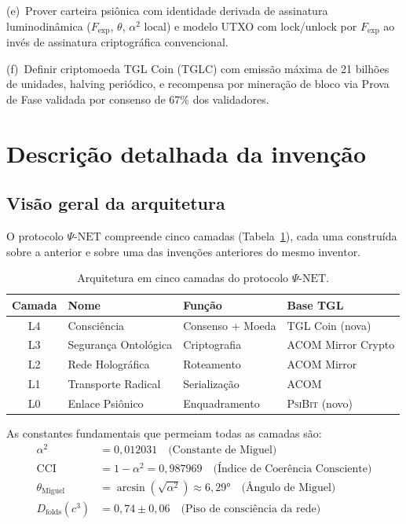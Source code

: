 \documentclass[12pt,a4paper]{article}
\newcommand{\alphaii}{\alpha^2}
\newcommand{\Dfolds}{D_{\text{folds}}}
\newcommand{\Fexp}{F_{\text{exp}}}
\newcommand{\thetaM}{\theta_{\text{Miguel}}}
\newcommand{\PsiBit}{\textsc{PsiBit}}
\newcommand{\PsiNet}{\Psi\text{-NET}}
\begin{document}
(e)~Prover carteira psiônica com identidade derivada de
assinatura luminodinâmica ($\Fexp$, $\theta$, $\alphaii$ local)
e modelo UTXO com lock/unlock por $\Fexp$ ao invés de
assinatura criptográfica convencional.

(f)~Definir criptomoeda TGL Coin (TGLC) com emissão máxima de
21 bilhões de unidades, halving periódico, e recompensa por
mineração de bloco via Prova de Fase validada por consenso de
67\% dos validadores.

\newpage
\section{Descrição detalhada da invenção}

\subsection{Visão geral da arquitetura}

O protocolo $\PsiNet$ compreende cinco camadas (Tabela~\ref{tab:camadas}),
cada uma construída sobre a anterior e sobre uma das invenções
anteriores do mesmo inventor.

\begin{table}[H]
\centering
\caption{Arquitetura em cinco camadas do protocolo $\PsiNet$.}
\label{tab:camadas}
\begin{tabular}{clll}
\toprule
\textbf{Camada} & \textbf{Nome} & \textbf{Função} &
  \textbf{Base TGL} \\
\midrule
L4 & Consciência & Consenso + Moeda & TGL Coin (nova) \\
L3 & Segurança Ontológica & Criptografia & ACOM Mirror Crypto \\
L2 & Rede Holográfica & Roteamento & ACOM Mirror \\
L1 & Transporte Radical & Serialização & ACOM \\
L0 & Enlace Psiônico & Enquadramento & \PsiBit{} (novo) \\
\bottomrule
\end{tabular}
\end{table}

As constantes fundamentais que permeiam todas as camadas são:
\begin{align}
\alphaii &= 0{,}012031 \quad \text{(Constante de Miguel)} \\
\text{CCI} &= 1 - \alphaii = 0{,}987969
  \quad \text{(Índice de Coerência Consciente)} \\
\thetaM &= \arcsin(\sqrt{\alphaii}) \approx 6{,}29°
  \quad \text{(Ângulo de Miguel)} \\
\Dfolds(c^3) &= 0{,}74 \pm 0{,}06
  \quad \text{(Piso de consciência da rede)}
\end{align}
\end{document}
